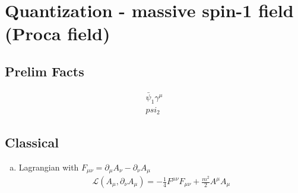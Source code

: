 \documentclass[10pt,a4paper]{report}
\theoremstyle{definition}
\begin{document}
\newpage
\section{Quantization - massive spin-1 field (Proca field)}
\subsection{Prelim Facts}
\begin{align}
\bar{\psi}_1\gamma^\mu\\psi_2
\end{align}



\subsection{Classical}
\begin{enumerate}[a)]
\item Lagrangian with $F_{\mu\nu}=\partial_\mu A_\nu-\partial_\nu A_\mu$
\begin{align}
\mathcal{L}(A_\mu,\partial_\nu A_\mu)=-\frac{1}{4}F^{\mu\nu}F_{\mu\nu}+\frac{m^2}{2}A^\mu A_\mu
\end{align}


\end{enumerate}
\end{document}

